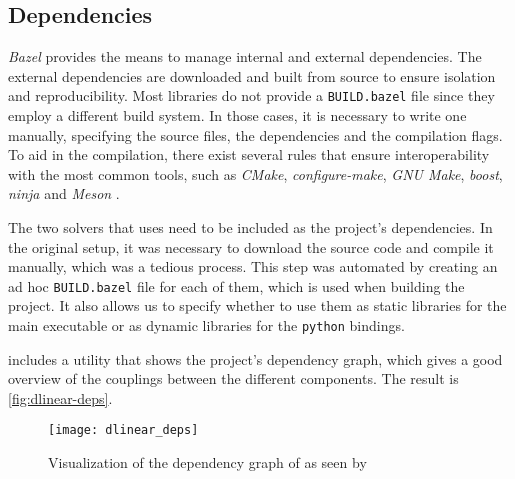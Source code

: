

\subsection*{Dependencies}

\textit{Bazel} provides the means to manage internal and external dependencies.
The external dependencies are downloaded and built from source to ensure isolation and reproducibility.
Most libraries do not provide a \texttt{BUILD.bazel} file since they employ a different build system.
In those cases, it is necessary to write one manually, specifying the source files, the dependencies and the compilation flags.
To aid in the compilation, there exist several rules that ensure interoperability with the most common tools, such as \textit{CMake}, \textit{configure-make}, \textit{GNU Make}, \textit{boost}, \textit{ninja} and \textit{Meson} \cite{repo:rules-foreign-cc}.



The two solvers that \dlinear uses need to be included as the project's dependencies.
In the original setup, it was necessary to download the source code and compile it manually, which was a tedious process.
This step was automated by creating an ad hoc \texttt{BUILD.bazel} file for each of them, which is used when building the project.
It also allows us to specify whether to use them as static libraries for the main executable or as dynamic libraries for the \texttt{python} bindings.



\bazel includes a utility that shows the project's dependency graph, which gives a good overview of the couplings between the different components.
The result is \autoref{fig:dlinear-deps}.

\begin{figure}[h]
    \centering
    \texttt{[image: dlinear\_deps]}
    \caption{Visualization of the dependency graph of \dlinear as seen by \bazel}\label{fig:dlinear-deps}
\end{figure}
